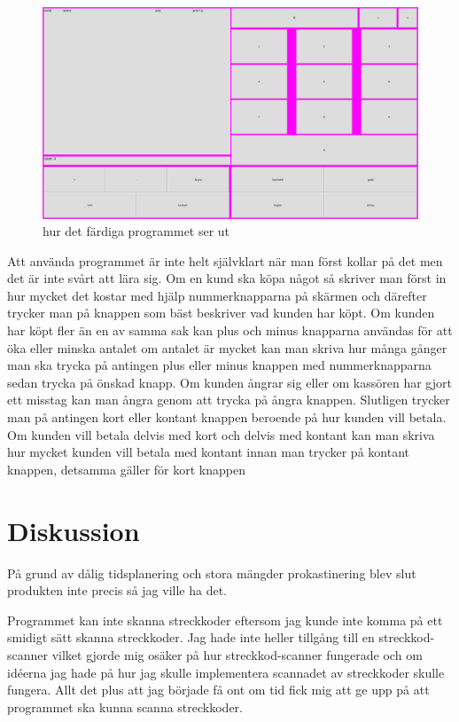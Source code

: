 \documentclass[a4paper, 12pt]{article}
\begin{document}
\begin{figure}[h!]
  \includegraphics[width=\linewidth]{img/ferdig.png}
  \caption{ hur det färdiga programmet ser ut}
  \label{fig:färdig}
\end{figure}


Att använda programmet är inte helt självklart när man först kollar på det men det är inte svårt att lära sig.
Om en kund ska köpa något så skriver man först in hur mycket det kostar med hjälp nummerknapparna på skärmen och därefter trycker man på knappen som bäst beskriver vad kunden har köpt.
Om kunden har köpt fler än en av samma sak kan plus och minus knapparna användas för att öka eller minska antalet om antalet är mycket kan man skriva hur många gånger man ska trycka på antingen plus eller minus knappen med nummerknapparna sedan trycka på önskad knapp.
 Om kunden ångrar sig eller om kassören har gjort ett misstag kan man ångra genom att trycka på ångra knappen.
 Slutligen trycker man på antingen kort eller kontant knappen beroende på hur kunden vill betala. Om kunden vill betala delvis med kort och delvis med kontant kan man skriva hur mycket kunden vill betala med kontant innan man trycker på kontant knappen, detsamma gäller för kort knappen


\section{Diskussion}

På grund av dålig tidsplanering och stora mängder prokastinering blev slut produkten inte precis så jag ville ha det.


Programmet kan inte skanna streckkoder eftersom jag kunde inte komma på ett smidigt sätt skanna streckkoder. 
Jag hade inte heller tillgång till en streckkod-scanner vilket gjorde mig osäker på hur streckkod-scanner fungerade och om idéerna jag hade på hur jag skulle implementera scannadet av streckkoder skulle fungera. Allt det plus att jag började få ont om tid fick mig att ge upp på att programmet ska kunna scanna streckkoder.
\end{document}
